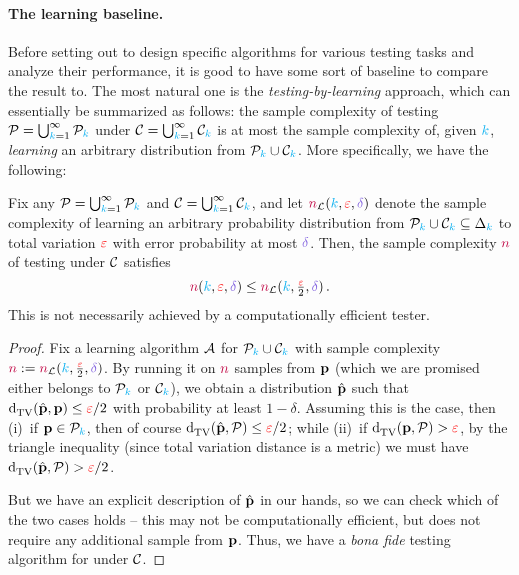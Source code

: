 \paragraph{The learning baseline.}
Before setting out to design specific algorithms for various testing tasks and analyze their performance, it is good to have some sort of baseline to compare the result to. The most natural one is the \emph{testing-by-learning} approach, which can essentially be summarized as follows: the sample complexity of testing $\mathcal{P}= \bigcup_{{\textcolor{cyan}{k}}=1}^\infty \mathcal{P}_{\textcolor{cyan}{k}}$ under $\mathcal{C}= \bigcup_{{\textcolor{cyan}{k}}=1}^\infty \mathcal{C}_{\textcolor{cyan}{k}}$ is at most the sample complexity of, given ${\textcolor{cyan}{k}}$, \emph{learning} an arbitrary distribution from $\mathcal{P}_{\textcolor{cyan}{k}}\cup\mathcal{C}_{\textcolor{cyan}{k}}$. More specifically, we have the following:
\begin{lemma}
  Fix any $\mathcal{P}= \bigcup_{{\textcolor{cyan}{k}}=1}^\infty \mathcal{P}_{\textcolor{cyan}{k}}$ and $\mathcal{C}= \bigcup_{{\textcolor{cyan}{k}}=1}^\infty \mathcal{C}_{\textcolor{cyan}{k}}$, and let $\ns_{\mathcal{L}}(\ab,\dst,\errprob)$ denote the sample complexity of learning an arbitrary probability distribution from $\mathcal{P}_{\textcolor{cyan}{k}}\cup\mathcal{C}_{\textcolor{cyan}{k}}\subseteq \Delta_{{\textcolor{cyan}{k}}}$ to total variation $\textcolor{red}{\varepsilon}$ with error probability at most $\errprob$. Then, the sample complexity ${\textcolor{purple}{n}}$ of testing \property under $\mathcal{C}$ satisfies
  \[
      \ns(\ab,\dst,\errprob) \leq \ns_{\mathcal{L}}(\ab,\tfrac{\dst}{2},\errprob)\,.
  \]
  This is not necessarily achieved by a computationally efficient tester.
\end{lemma}
\begin{proof}
Fix a learning algorithm $\mathcal{A}$ for $\mathcal{P}_{\textcolor{cyan}{k}}\cup\mathcal{C}_{\textcolor{cyan}{k}}$ with sample complexity $\ns\eqdef \ns_{\mathcal{L}}(\ab,\tfrac{\dst}{2},\errprob)$. By running it on ${\textcolor{purple}{n}}$ \iid samples from $\mathbf{p}$ (which we are promised either belongs to $\mathcal{P}_{\textcolor{cyan}{k}}$ or $\mathcal{C}_{\textcolor{cyan}{k}}$), we obtain a distribution $\hat{\mathbf{p}}$ such that $\totalvardist{\hat{\p}}{\p} \leq \dst/2$ with probability at least $1-\delta$. Assuming this is the case, then (i)~if $\mathbf{p}\in\mathcal{P}_{\textcolor{cyan}{k}}$, then of course $\totalvardist{\hat{\p}}{\property} \leq \dst/2$; while (ii)~if $\totalvardist{\p}{\property} > \dst$, by the triangle inequality (since total variation distance is a metric) we must have $\totalvardist{\hat{\p}}{\property} > \dst/2$. 

But we have an explicit description of $\hat{\mathbf{p}}$ in our hands, so we can check which of the two cases holds -- this may not be computationally efficient, but does not require any additional sample from $\mathbf{p}$. Thus, we have a \emph{bona fide} testing algorithm for \property under $\mathcal{C}$.
\end{proof}
